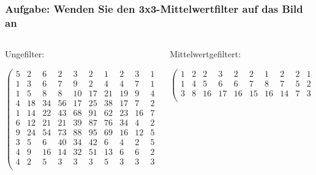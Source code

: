 \documentclass[aspectratio=169]{beamer}
\begin{document}
\begin{frame}
    \frametitle{Aufgabe: Wenden Sie den 3x3-Mittelwertfilter auf das Bild an}
\begin{columns}
    \begin{column}{0.5\textwidth}
    \begin{alertblock}
        {Ungefilter:}
        \begin{footnotesize}
        \begin{equation*}
            \begin{pmatrix}
                5 &  2 &  6 &  2 &  3 &  2 &  1 &  2 &  3 &  1 \\
                1 &  3 &  6 &  7 &  9 &  2 &  4 &  4 &  7 &  1 \\
                1 &  5 &  8 &  8 & 10 & 17 & 21 & 19 &  9 &  4 \\
                4 & 18 & 34 & 56 & 17 & 25 & 38 & 17 &  7 &  2 \\
                1 & 14 & 22 & 43 & 68 & 91 & 62 & 23 & 16 &  7 \\
                6 & 12 & 21 & 21 & 39 & 87 & 76 & 34 &  4 &  2 \\
                9 & 24 & 54 & 73 & 88 & 95 & 69 & 16 & 12 &  5 \\
                3 &  5 &  6 & 40 & 34 & 42 &  6 &  4 &  2 &  5 \\
                4 &  9 & 16 & 14 & 32 & 51 & 13 &  6 &  6 &  2 \\
                4 &  2 &  5 & 3  &  3 &  3 &  5 &  3 &  3 &  3 \\
            \end{pmatrix}
        \end{equation*}
        \end{footnotesize}
    \end{alertblock}
    \end{column}
    \begin{column}{0.5\textwidth}
    \begin{alertblock}
        {Mittelwertgefiltert:}
        \begin{footnotesize}
        \begin{equation*}
            \begin{pmatrix}
                1 &  2 &  2 &  3 &  2 &  2 &  1 &  2 &  2 &  1 \\
                1 &  4 &  5 &  6 &  6 &  7 &  8 &  7 &  5 &  2 \\
                3 &  8 & 16 & 17 & 16 & 15 & 16 & 14 &  7 &  3 \\

\end{pmatrix}
\end{equation*}
\end{footnotesize}
\end{alertblock}
\end{column}
\end{columns}
\end{frame}
\end{document}
